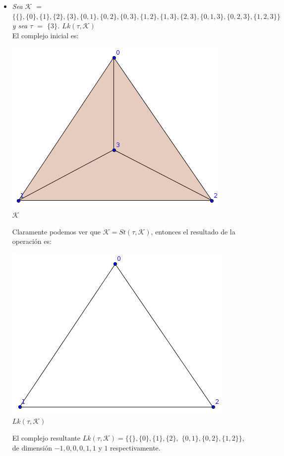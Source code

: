 \documentclass{article}
\begin{document}
\begin{enumerate}
{\begin{itemize}
    \item{
        \textsl{
        Sea $\mathcal{K}$ $=$ $\{\{\}, \{0\}, \{1\}, \{2\}, \{3\},
        \{0,1\}, \{0,2\}, \{0,3\}, \{1,2\}, \{1,3\}, \{2,3\}, \{0,1,3\},
        \{0,2,3\}, \{1,2,3\}\}$ y sea $\tau$ $=$ $\{3\}$. $Lk(\tau,\mathcal{K})$
      }\\

      El complejo inicial es:
      \begin{center}
        \includegraphics[scale=0.4]{entrada3_2.png}
        \\ $\mathcal{K}$
      \end{center}
      Claramente podemos ver que $\mathcal{K} = St(\tau,\mathcal{K})$, entonces
      el resultado de la operación es:
      \begin{center}
        \includegraphics[scale=0.4]{salida3_2.png}
        \\ $Lk(\tau,\mathcal{K})$
      \end{center}
      El complejo resultante $Lk(\tau,\mathcal{K}) = \{\{\}, \{0\}, \{1\}, \{2\}, $
      $\{0,1\}, \{0,2\}, \{1, 2\}\}$, de dimensión $-1, 0, 0, 0, 1, 1$ y $1$ respectivamente.
    }


\end{itemize}}
\end{enumerate}
\end{document}

